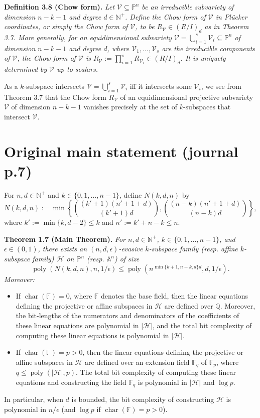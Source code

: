 \documentclass[10pt,a4paper]{article}
\newcommand{\FF}{\mathbb F}
\newcommand{\PP}{\mathbb P}
\newcommand{\Aspace}{\mathbb A}
\newenvironment{result}[1]{\par\medskip\noindent\textbf{#1.}\itshape}{\par\medskip}
\begin{document}
\begin{result}{Definition 3.8 (Chow form)}
Let $\mathcal V\subseteq\PP^n$ be an irreducible subvariety of dimension $n-k-1$ and degree $d\in\mathbb N^+$. Define the Chow form of $\mathcal V$ in Pl\"ucker coordinates, or simply the Chow form of $\mathcal V$, to be $R_{\mathcal V}\in(R/I)_d$ as in Theorem 3.7.
More generally, for an equidimensional subvariety $\mathcal V=\bigcup_{i=1}^s\mathcal V_i\subseteq\PP^n$ of dimension $n-k-1$ and degree $d$, where $\mathcal V_1,\ldots,\mathcal V_s$ are the irreducible components of $\mathcal V$, the Chow form of $\mathcal V$ is $R_{\mathcal V}:=\prod_{i=1}^sR_{\mathcal V_i}\in(R/I)_d$. It is uniquely determined by $\mathcal V$ up to scalars.
\end{result}
As a $k$-subspace intersects $\mathcal V=\bigcup_{i=1}^s\mathcal V_i$ iff it intersects some $\mathcal V_i$, we see from Theorem 3.7 that the Chow form $R_{\mathcal V}$ of an equidimensional projective subvariety $\mathcal V$ of dimension $n-k-1$ vanishes precisely at the set of $k$-subspaces that intersect $\mathcal V$.

\section*{Original main statement (journal p.7)}
For $n,d\in\mathbb N^+$ and $k\in\{0,1,\ldots,n-1\}$, define $N(k,d,n)$ by
\[N(k,d,n):=\min\left\{\binom{(k'+1)(n'+1+d)}{(k'+1)d},\binom{(n-k)(n'+1+d)}{(n-k)d}\right\},\]
where $k':=\min\{k,d-2\}\le k$ and $n':=k'+n-k\le n$.
\begin{result}{Theorem 1.7 (Main Theorem)}
For $n,d\in\mathbb N^+$, $k\in\{0,1,\ldots,n-1\}$, and $\epsilon\in(0,1)$, there exists an $(n,d,\epsilon)$-evasive $k$-subspace family (resp. affine $k$-subspace family) $\mathcal H$ on $\PP^n$ (resp. $\Aspace^n$) of size
\[\operatorname{poly}(N(k,d,n),n,1/\epsilon)\le\operatorname{poly}(n^{\min\{k+1,n-k,d\}d},d,1/\epsilon).\]
Moreover:
\begin{itemize}
\item If $\operatorname{char}(\FF)=0$, where $\FF$ denotes the base field, then the linear equations defining the projective or affine subspaces in $\mathcal H$ are defined over $\mathbb Q$. Moreover, the bit-lengths of the numerators and denominators of the coefficients of these linear equations are polynomial in $|\mathcal H|$, and the total bit complexity of computing these linear equations is polynomial in $|\mathcal H|$.
\item If $\operatorname{char}(\FF)=p>0$, then the linear equations defining the projective or affine subspaces in $\mathcal H$ are defined over an extension field $\FF_q$ of $\FF_p$, where $q\le\operatorname{poly}(|\mathcal H|,p)$. The total bit complexity of computing these linear equations and constructing the field $\FF_q$ is polynomial in $|\mathcal H|$ and $\log p$.
\end{itemize}
In particular, when $d$ is bounded, the bit complexity of constructing $\mathcal H$ is polynomial in $n/\epsilon$ (and $\log p$ if $\operatorname{char}(\FF)=p>0$).
\end{result}
\end{document}
